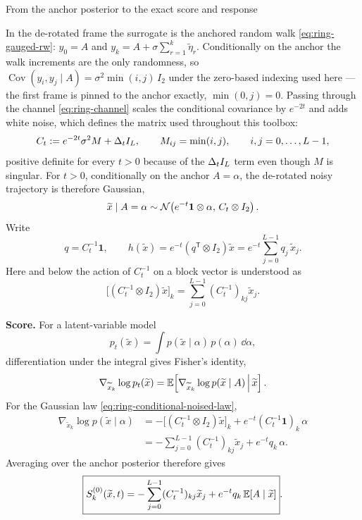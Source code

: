 \begin{toolbox}{From the anchor posterior to the exact
score and response}

In the de-rotated frame the surrogate is the anchored random walk
\eqref{eq:ring-gauged-rw}: $y_0 = A$ and
$y_k = A + \sigma\sum_{r=1}^{k}\widetilde\eta_r$. Conditionally on the
anchor the walk increments are the only randomness, so
$\operatorname{Cov}(y_i, y_j \mid A) = \sigma^2 \min(i,j)\, I_2$ under the
zero-based indexing used here --- the first frame is pinned to the anchor
exactly, $\min(0, j) = 0$. Passing through the channel
\eqref{eq:ring-channel} scales the conditional covariance by $e^{-2t}$ and
adds white noise, which defines the matrix used throughout this toolbox:
\begin{equation}
  C_t := e^{-2t}\sigma^2 M + \Delta_t I_L,
  \qquad
  M_{ij} = \min(i,j),
  \qquad i,j = 0,\dots,L-1,
  \label{eq:ring-Ct-def}
\end{equation}
positive definite for every $t > 0$ because of the $\Delta_t I_L$ term even
though $M$ is singular. For $t>0$, conditionally on the anchor $A=\alpha$, the
de-rotated noisy trajectory is therefore Gaussian,
\begin{equation}
  \widetilde x \mid A=\alpha
  \sim
  \mathcal{N}\!\left(
    e^{-t}\mathbf 1\otimes\alpha,\,
    C_t\otimes I_2
  \right).
  \label{eq:ring-conditional-noised-law}
\end{equation}
Write
\begin{equation}
  q = C_t^{-1}\mathbf 1,
  \qquad
  h(\widetilde x)
  = e^{-t}(q^{\mathsf T}\otimes I_2)\widetilde x
  = e^{-t}\sum_{j=0}^{L-1} q_j\,\widetilde x_j .
  \label{eq:ring-anchor-statistic}
\end{equation}
Here and below the action of $C_t^{-1}$ on a block vector is understood as
\[
  \big[(C_t^{-1}\otimes I_2)\widetilde x\big]_k
  =
  \sum_{j=0}^{L-1}(C_t^{-1})_{kj}\widetilde x_j .
\]

\medskip
\noindent\textbf{Score.}
For a latent-variable model
\[
  p_t(\widetilde x)
  =
  \int p(\widetilde x\mid\alpha)\,p(\alpha)\,\dd\alpha,
\]
differentiation under the integral gives Fisher's identity,
\begin{equation}
  \nabla_{\widetilde x_k}\log p_t(\widetilde x)
  =
  \mathbb{E}\!\left[
    \nabla_{\widetilde x_k}
    \log p(\widetilde x\mid A)
    \,\middle|\,\widetilde x
  \right].
  \label{eq:ring-fisher-identity}
\end{equation}
For the Gaussian law \eqref{eq:ring-conditional-noised-law},
\begin{align}
  \nabla_{\widetilde x_k}
  \log p(\widetilde x\mid\alpha)
  &=
  -\big[(C_t^{-1}\otimes I_2)\widetilde x\big]_k
  +e^{-t}(C_t^{-1}\mathbf 1)_k\,\alpha
  \nonumber\\
  &=
  -\sum_{j=0}^{L-1}(C_t^{-1})_{kj}\widetilde x_j
  +e^{-t}q_k\,\alpha .
  \label{eq:ring-conditional-score}
\end{align}
Averaging over the anchor posterior therefore gives
\begin{equation}
  \boxed{
  S_k^{(0)}(\widetilde x,t)
  =
  -\sum_{j=0}^{L-1}(C_t^{-1})_{kj}\widetilde x_j
  +e^{-t}q_k\,\mathbb{E}[A\mid\widetilde x]
  }.
\end{equation}


\end{toolbox}
